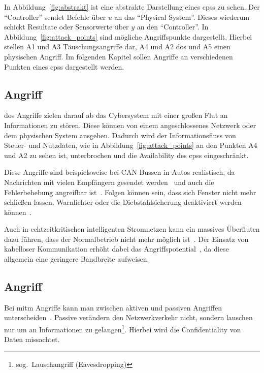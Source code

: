 \documentclass[final,bibliography=totocnumbered]{include/sikseminar}
\newcommand{\cps}{\glspl{cps}\xspace}
\begin{document}
In Abbildung~\ref{fig:abstrakt} ist eine abstrakte Darstellung eines \cps zu sehen.
Der \enquote{Controller} sendet Befehle über $u$ an das \enquote{Physical System}.
Dieses wiederum schickt Resultate oder Sensorwerte über $y$ an den \enquote{Controller}.
In Abbildung~\ref{fig:attack_points} sind mögliche Angriffspunkte dargestellt.
Hierbei stellen A1 und A3 Täuschungsangriffe dar, A4 und A2 \gls{dos} und A5 einen physischen Angriff.
Im folgenden Kapitel sollen Angriffe an verschiedenen Punkten eines \cps dargestellt werden.


\subsection{ Angriff}\label{subsec:dos}
\gls{dos} Angriffe zielen darauf ab das Cybersystem mit einer großen Flut an Informationen zu stören.
Diese können von einem angeschlossenes Netzwerk oder dem physischen System ausgehen.
Dadurch wird der Informationsfluss von Steuer- und Nutzdaten, wie in Abbildung~\ref{fig:attack_points} an den Punkten A4 und A2 zu sehen ist, unterbrochen und die Availability des \cps eingeschränkt.

Diese Angriffe sind beispielsweise bei CAN Bussen in Autos realistisch, da Nachrichten mit vielen Empfängern gesendet werden~\cite{KCR+10} und auch die Fehlerbehebung angreifbar ist~\cite{CDV13}.
Folgen können sein, dass sich Fenster nicht mehr schließen lassen, Warnlichter oder die Diebstahlsicherung deaktiviert werden können~\cite{HKD08}.

Auch in echtzeitkritischen intelligenten Stromnetzen kann ein massives Überfluten dazu führen, dass der Normalbetrieb nicht mehr möglich ist~\cite{LLW+10}.
Der Einsatz von kabelloser Kommunikation erhöht dabei das Angriffspotential~\cite{LWW11}, da diese allgemein eine geringere Bandbreite aufweisen.

\subsection{ Angriff}\label{subsec:mitm}
Bei \gls{mitm} Angriffe kann man zwischen aktiven und passiven Angriffen unterscheiden~\cite{WYX+10}.
Passive verändern den Netzwerkverkehr nicht, sondern lauschen nur um an Informationen zu gelangen\footnote{sog.\ Lauschangriff (Eavesdropping)}.
Hierbei wird die Confidentiality von Daten missachtet.
\end{document}
